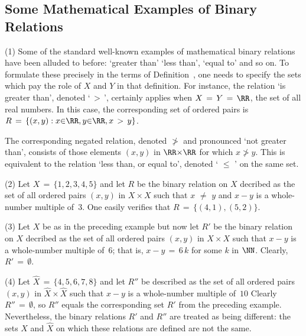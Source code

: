 {        \subsection{\small{{\bf Some Mathematical Examples of Binary Relations}}}
        \label{ExampA12.65B}

\V

        (1) Some of the standard well-known examples of mathematical binary relations have been alluded to before:
    `greater than' `less than', `equal to' and so on. To formulate these precisely in the terms of Definition~,
    one needs to specify the sets which pay the role of $X$ and $Y$ in that definition.
    For instance, the relation `is greater than', denoted `$\,>\,$', certainly applies when $X \,=\, Y \,=\, {\RR}$, the set of all real numbers.
    In this case, the corresponding set of ordered pairs is $R \,=\, \{(x,y): x{\in}{\RR}, y{\in}{\RR}, x\,>\,y\}$.

        The corresponding negated relation, denoted $\not>$ and pronounced `not greater than',
    consists of those elements $(x,y)$ in ${\RR}{\times}{\RR}$ for which $x\not>y$.
    This is equivalent to the relation `less than, or equal to', denoted 	`$\,\,{\leq}\,\,$' on the same set.

\V

        (2) Let $X \,=\, \{1,2,3,4,5\}$ and let $R$ be the binary relation on $X$ decribed as the set of all ordered pairs $(x,y)$ in $X{\times}X$
    such that $x \,\,{\neq}\,\, y$ and $x-y$ is a whole-number multiple of~$3$. One easily verifies that $R \,=\, \{(4,1), (5,2)\}$.

\V

        (3) Let $X$ be as in the preceding example but now let $R'$ be the binary relation on $X$
    decribed as the set of all ordered pairs $(x,y)$ in $X{\times}X$ such that $x-y$ is a whole-number multiple of~$6$;
    that is, $x-y \,=\, 6\,k$ for some $k$ in ${\NN}$. Clearly, $R' \,=\, {\emptyset}$.

\V

        (4) Let $\hat{X} \,=\, \{4, 5, 6, 7, 8\}$ and let $R''$ be described as the set of all ordered pairs $(x,y)$ in $\hat{X}{\times}\hat{X}$ such that $x-y$ is a whole-number multiple of~$10$
    Clearly $R'' \,=\,{\emptyset}$, so $R''$ equals the corresponding set $R'$ from the preceding example.
    Nevertheless, the binary relations $R'$ and $R''$ are treated as being different:
    the sets $X$ and $\hat{X}$ on which these relations are defined are not the same.



}
